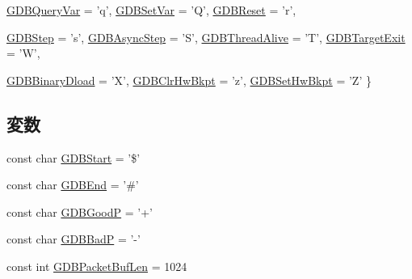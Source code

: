 \begin{DoxyCompactItemize}
\hyperlink{base_2remote__gdb_8hh_a5f3ce331fa8c2c19ed26b852847a3497ab6d45fb94f09b488967f93999dcfd1f2}{GDBQueryVar} =  'q', 
\hyperlink{base_2remote__gdb_8hh_a5f3ce331fa8c2c19ed26b852847a3497aecc7624d45fae28295d2f7f1bf0b470b}{GDBSetVar} =  'Q', 
\hyperlink{base_2remote__gdb_8hh_a5f3ce331fa8c2c19ed26b852847a3497a51f7b8c24bb63590754cd8c0d709a72e}{GDBReset} =  'r', 
\par
\hyperlink{base_2remote__gdb_8hh_a5f3ce331fa8c2c19ed26b852847a3497a97f95c3ab542120d5e9dfec25c1e2d60}{GDBStep} =  's', 
\hyperlink{base_2remote__gdb_8hh_a5f3ce331fa8c2c19ed26b852847a3497acbc40326c7d502ea24fb2299ab1b94e3}{GDBAsyncStep} =  'S', 
\hyperlink{base_2remote__gdb_8hh_a5f3ce331fa8c2c19ed26b852847a3497a02a96e461b322d3971cd6108d1e81b44}{GDBThreadAlive} =  'T', 
\hyperlink{base_2remote__gdb_8hh_a5f3ce331fa8c2c19ed26b852847a3497ac9269a79ec5c92381f58083823c0d4c2}{GDBTargetExit} =  'W', 
\par
\hyperlink{base_2remote__gdb_8hh_a5f3ce331fa8c2c19ed26b852847a3497a5f15d8ffbc4c5baa05f73b7d997d882c}{GDBBinaryDload} =  'X', 
\hyperlink{base_2remote__gdb_8hh_a5f3ce331fa8c2c19ed26b852847a3497a81ee9db02e7aba80482f745540febfbc}{GDBClrHwBkpt} =  'z', 
\hyperlink{base_2remote__gdb_8hh_a5f3ce331fa8c2c19ed26b852847a3497abf939a1a586587f591156b2aeb4c268f}{GDBSetHwBkpt} =  'Z'
 \}
\end{DoxyCompactItemize}
\subsection*{変数}
\begin{DoxyCompactItemize}
\item 
const char \hyperlink{base_2remote__gdb_8hh_a05c13e29a32dcf8a9af97d1dcb81b170}{GDBStart} = '\$'
\item 
const char \hyperlink{base_2remote__gdb_8hh_a71e0b9ce6fd576fc3ce9dbb5989d5978}{GDBEnd} = '\#'
\item 
const char \hyperlink{base_2remote__gdb_8hh_aed92843772362fd32e1305e05ed1e0c5}{GDBGoodP} = '+'
\item 
const char \hyperlink{base_2remote__gdb_8hh_a5aef3fc10123b588700dba5c2ab9de24}{GDBBadP} = '-\/'
\item 
const int \hyperlink{base_2remote__gdb_8hh_a346de31138a53901e54429d682270d8e}{GDBPacketBufLen} = 1024
\end{DoxyCompactItemize}


